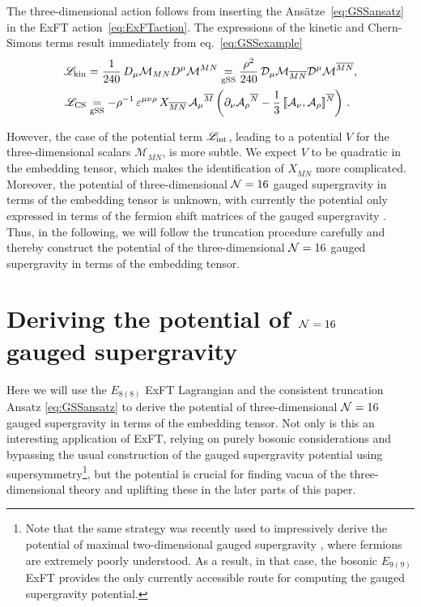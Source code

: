 \documentclass[a4paper, 11pt]{article}
\numberwithin{equation}{section}
\newcommand{\ov}[1]{\overline{#1}}
\newcommand{\EE}{\ensuremath{E_{8(8)}}\xspace}
\newcommand{\En}[1]{E_{#1(#1)}}
\newcommand{\+}{\oplus}
\newcommand{\fl}[1]{\ov{#1}}
\newcommand{\M}{\ensuremath{\mathcal{M}}\xspace}
\newcommand{\A}{\ensuremath{\mathcal{A}}\xspace}
\begin{document}
The three-dimensional action follows from inserting the Ansätze~\eqref{eq:GSSansatz} in the ExFT action~\eqref{eq:ExFTaction}. The expressions of the kinetic and Chern-Simons terms result immediately from eq.~\eqref{eq:GSSexample}
\begin{equation}
	\begin{split}
		\mathscr{L}_{\rm kin} &= \frac{1}{240}\,D_{\mu}\M_{MN}D^{\mu}\M^{MN} \underset{\rm gSS}{=} \frac{\rho^{2}}{240}\,{\cal D}_{\mu}\M_{\fl{MN}}{\cal D}^{\mu}\M^{\fl{MN}}, \\
		\mathscr{L}_{\rm CS} &\underset{\rm gSS}{=} -\rho^{-1}\,\varepsilon^{\mu\nu\rho}\,X_{\fl{MN}}\,\A_{\mu}{}^{\fl{M}} \left(\partial_{\nu}\A_{\rho}{}^{\fl{N}}-\frac{1}{3}\,\llbracket\A_{\nu},\A_{\rho}\rrbracket^{\fl{N}}\right)\,.
	\end{split}
\end{equation}

However, the case of the potential term $\mathscr{L}_{\rm int}$, leading to a potential $V$ for the three-dimensional scalars $\M_{\fl{MN}}$, is more subtle. We expect $V$ to be quadratic in the embedding tensor, which makes the identification of $X_{\fl{MN}}$ more complicated. Moreover, the potential of three-dimensional ${\cal N}=16$ gauged supergravity in terms of the embedding tensor is unknown, with currently the potential only expressed in terms of the fermion shift matrices of the gauged supergravity \cite{Nicolai:2000sc,Nicolai:2001sv}. Thus, in the following, we will follow the truncation procedure carefully and thereby construct the potential of the three-dimensional ${\cal N}=16$ gauged supergravity in terms of the embedding tensor.

\section{Deriving the potential of ${\cal N}=16$ gauged supergravity} \label{s:Potential}
Here we will use the $\EE$ ExFT Lagrangian and the consistent truncation Ansatz \eqref{eq:GSSansatz} to derive the potential of three-dimensional ${\cal N}=16$ gauged supergravity \cite{Nicolai:2000sc,Nicolai:2001sv} in terms of the embedding tensor. Not only is this an interesting application of ExFT, relying on purely bosonic considerations and bypassing the usual construction of the gauged supergravity potential using supersymmetry\footnote{Note that the same strategy was recently used to impressively derive the potential of maximal two-dimensional gauged supergravity \cite{Bossard:2022wvi}, where fermions are extremely poorly understood. As a result, in that case, the bosonic $\En{9}$ ExFT \cite{Bossard:2018utw,Bossard:2021jix} provides the only currently accessible route for computing the gauged supergravity potential.}, but the potential is crucial for finding vacua of the three-dimensional theory and uplifting these in the later parts of this paper.
\end{document}
